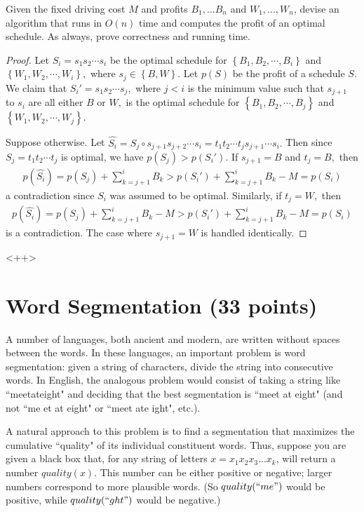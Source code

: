 \documentclass{article}
\begin{document}
Given the fixed driving cost $M$ and profits $B_1, \dots B_n$ and $W_1, \dots, W_n$, devise an algorithm that runs in $O(n)$ time and computes the profit of an optimal schedule.  As always, prove correctness and running time.  
\begin{proof}
	Let $S_i=s_1s_2\cdots s_i$ be the optimal schedule for $\left\{ B_1, B_2, \cdots, B_i \right\}$ and $\left\{ W_1, W_2, \cdots, W_i \right\},$ where $s_j\in\left\{ B, W \right\}.$ Let $p(S)$ be the profit of a schedule $S.$ We claim that $S_i' = s_1s_2\cdots s_{j},$ where $j<i$ is the minimum value such that $s_{j+1}$ to $s_i$ are all either $B$ or $W,$ is the optimal schedule for $\left\{ B_1, B_2, \cdots, B_j \right\}$ and $\left\{ W_1, W_2, \cdots, W_j \right\}.$

	Suppose otherwise. Let $\hat{S_i} = S_j\circ s_{j+1}s_{j+2}\cdots s_i = t_1t_2\cdots t_j s_{j+1}\cdots s_i.$ Then since $S_j=t_1t_2\cdots t_j$ is optimal, we have $p(S_j)>p(S_i').$ If $s_{j+1}= B$ and $t_j=B,$ then
	\begin{align*}
		p(\hat{S_i})=p(S_j) + \sum_{k=j+1}^{i} B_k > p(S_i') + \sum_{k=j+1}^{i} B_k - M= p(S_i) 
	\end{align*}
	a contradiction since $S_i$ was assumed to be optimal. Similarly, if $t_j=W,$ then
	\begin{align*}
		p(\hat{S_i}) = p(S_j) + \sum_{k=j+1}^{i} B_k - M > p(S_i') + \sum_{k=j+1}^{i} B_k - M = p(S_i)
	\end{align*}
	is a contradiction. The case where $s_{j+1}=W$ is handled identically. 
\end{proof}<++>

\section{Word Segmentation (33 points)}
A number of languages, both ancient and modern, are written without spaces between the words.  In these languages, an important problem is word segmentation: given a string of characters, divide the string into consecutive words.  In English, the analogous problem would consist of taking a string like ``meetateight" and deciding that the best segmentation is ``meet at eight" (and not ``me et at eight" or ``meet ate ight", etc.).  

A natural approach to this problem is to find a segmentation that maximizes the cumulative ``quality"  of its individual constituent words.  Thus, suppose you are given a black box that, for any string of letters $x = x_1 x_2 x_3 \dots x_k$, will return a number $quality(x)$.  This number can be either positive or negative; larger numbers correspond to more plausible words.  (So $quality(``me")$ would be positive, while $quality(``ght")$ would be negative.)
\end{document}
